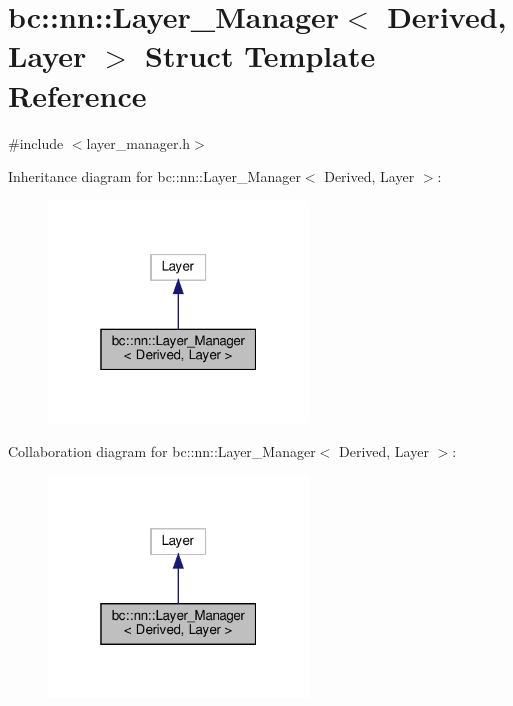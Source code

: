 \hypertarget{structbc_1_1nn_1_1Layer__Manager}{}\section{bc\+:\+:nn\+:\+:Layer\+\_\+\+Manager$<$ Derived, Layer $>$ Struct Template Reference}
\label{structbc_1_1nn_1_1Layer__Manager}


{\ttfamily \#include $<$layer\+\_\+manager.\+h$>$}



Inheritance diagram for bc\+:\+:nn\+:\+:Layer\+\_\+\+Manager$<$ Derived, Layer $>$\+:\nopagebreak
\begin{figure}[H]
\begin{center}
\leavevmode
\includegraphics[width=196pt]{structbc_1_1nn_1_1Layer__Manager__inherit__graph}
\end{center}
\end{figure}


Collaboration diagram for bc\+:\+:nn\+:\+:Layer\+\_\+\+Manager$<$ Derived, Layer $>$\+:\nopagebreak
\begin{figure}[H]
\begin{center}
\leavevmode
\includegraphics[width=196pt]{structbc_1_1nn_1_1Layer__Manager__coll__graph}
\end{center}
\end{figure}
